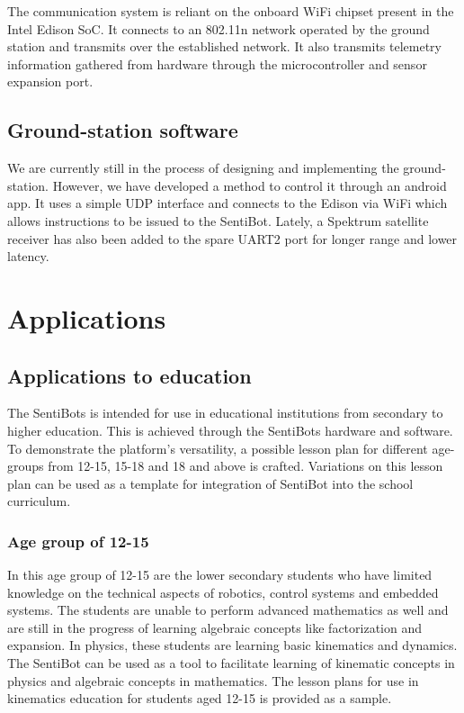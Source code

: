 \documentclass[12pt]{article}
\begin{document}
The communication system is reliant on the onboard WiFi chipset present in the Intel Edison SoC. It connects to an 802.11n network operated by the ground station and transmits over the established network. It also transmits telemetry information gathered from hardware through the microcontroller and sensor expansion port.

\subsection{Ground-station software}

We are currently still in the process of designing and implementing the ground-station. However, we have developed a method to control it through an android app. It uses a simple UDP interface and connects to the Edison via WiFi which allows instructions to be issued to the SentiBot. Lately, a Spektrum satellite receiver has also been added to the spare UART2 port for longer range and lower latency.

\section{Applications}

\subsection{Applications to education}

The SentiBots is intended for use in educational institutions from secondary to higher education. This is achieved through the SentiBots hardware and software. To demonstrate the platform’s versatility, a possible lesson plan for different age-groups from 12-15, 15-18 and 18 and above is crafted. Variations on this lesson plan can be used as a template for integration of SentiBot into the school curriculum.

\subsubsection{Age group of 12-15}

In this age group of 12-15 are the lower secondary students who have limited knowledge on the technical aspects of robotics, control systems and embedded systems. The students are unable to perform advanced mathematics as well and are still in the progress of learning algebraic concepts like factorization and expansion. In physics, these students are learning basic kinematics and dynamics. The SentiBot can be used as a tool to facilitate learning of kinematic concepts in physics and algebraic concepts in mathematics. The lesson plans for use in kinematics education for students aged 12-15 is provided as a sample.
\end{document}
